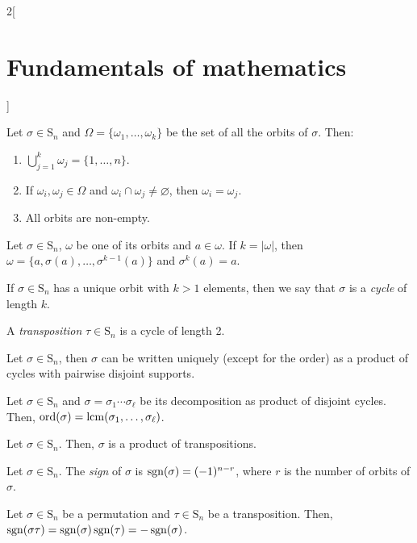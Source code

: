 \documentclass[../../../main.tex]{subfiles}
\begin{document}
\begin{multicols}{2}[\section{Fundamentals of mathematics}]
\begin{definition}
  \end{definition}
  \begin{theorem}
    Let $\sigma\in \text{S}_n$ and $\Omega=\{\omega_1,\ldots,\omega_k\}$ be the set of all the orbits of $\sigma$. Then:
    \begin{enumerate}
      \item $\bigcup_{j=1}^k \omega_j=\{1,\ldots,n\}$.
      \item If $\omega_i,\omega_j\in\Omega$ and $\omega_i\cap\omega_j\ne\varnothing$, then $\omega_i=\omega_j$.
      \item All orbits are non-empty.
    \end{enumerate}
  \end{theorem}
  \begin{theorem}
    Let $\sigma\in \text{S}_n$, $\omega$ be one of its orbits and $a\in\omega$. If $k=|\omega|$, then $\omega=\{a,\sigma(a),\ldots,\sigma^{k-1}(a)\}$ and $\sigma^k(a)=a$.
  \end{theorem}
  \begin{definition}
    If $\sigma\in \text{S}_n$ has a unique orbit with $k>1$ elements, then we say that $\sigma$ is a \emph{cycle} of length $k$.
  \end{definition}
  \begin{definition}
    A \emph{transposition} $\tau\in \text{S}_n$ is a cycle of length 2.
  \end{definition}
  \begin{theorem}
    Let $\sigma\in \text{S}_n$, then $\sigma$ can be written uniquely (except for the order) as a product of cycles with pairwise disjoint supports.
  \end{theorem}
  \begin{corollary}
    Let $\sigma\in \text{S}_n$ and $\sigma=\sigma_1\cdots\sigma_\ell$ be its decomposition as product of disjoint cycles. Then, $\text{ord}(\sigma)=\operatorname{lcm}(\sigma_1,\ldots,\sigma_\ell)$.
  \end{corollary}
  \begin{corollary}
    Let $\sigma\in \text{S}_n$. Then, $\sigma$ is a product of transpositions.
  \end{corollary}
  \begin{definition}
    Let $\sigma\in \text{S}_n$. The \emph{sign} of $\sigma$ is $\operatorname{sgn}(\sigma)=(-1)^{n-r}$, where $r$ is the number of orbits of $\sigma$.
  \end{definition}
  \begin{theorem}
    Let $\sigma\in \text{S}_n$ be a permutation and $\tau\in \text{S}_n$ be a transposition. Then, $\operatorname{sgn}(\sigma\tau)=\operatorname{sgn}(\sigma)\operatorname{sgn}(\tau)=-\operatorname{sgn}(\sigma)$.

\end{theorem}
\end{multicols}
\end{document}

